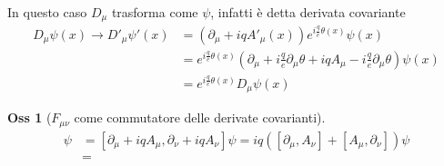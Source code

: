 \documentclass[10pt,a4paper]{article}
\theoremstyle{definition}
\newtheorem{observation}{Oss}[section]
\begin{document}
In questo caso $D_\mu$ trasforma come $\psi$, infatti è detta derivata covariante
\begin{align*}
    D_\mu\psi(x) \to D'_\mu\psi'(x) &= \left(\partial_\mu + iqA'_\mu(x)\right)e^{i\frac{q}{e}\theta(x)}\psi(x) \\
    &= e^{i\frac{q}{e}\theta(x)}\left(\partial_\mu + i\frac{q}{e}\partial_\mu\theta + iqA_\mu - i\frac{q}{e}\partial_\mu\theta\right)\psi(x) \\
    &= e^{i\frac{q}{e}\theta(x)}D_\mu\psi(x)    
\end{align*}

\begin{observation}[$F_{\mu \nu}$ come commutatore delle derivate covarianti]
    \begin{align*}
        [D_\mu, D_\nu]\psi &= [\partial_\mu + iqA_\mu, \partial_\nu + iqA_\nu]\psi = iq([\partial_\mu, A_\nu] + [A_\mu, \partial_\nu])\psi \\
        &= 
    \end{align*}
\end{observation}
\end{document}
